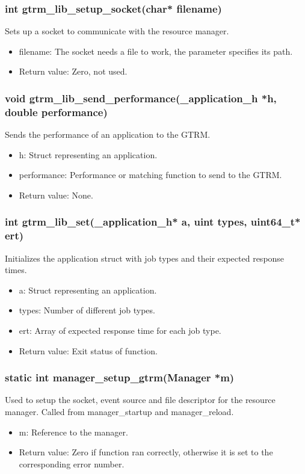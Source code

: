 \documentclass[nobiblatex]{LTHthesis}
\begin{document}
\subsubsection{int gtrm\_lib\_setup\_socket(char* filename)}
Sets up a socket to communicate with the resource manager.
\begin{itemize}
\item filename: The socket needs a file to work, the parameter specifies its path.
\item Return value: Zero, not used.
\end{itemize}

\subsubsection{void gtrm\_lib\_send\_performance(\_application\_h *h, double performance)}
Sends the performance of an application to the GTRM.
\begin{itemize}
\item h: Struct representing an application.
\item performance: Performance or matching function to send to the GTRM.
\item Return value: None.
\end{itemize}

\subsubsection{int gtrm\_lib\_set(\_application\_h* a, uint types, uint64\_t* ert)}
Initializes the application struct with job types and their expected response times.
\begin{itemize}
\item a: Struct representing an application.
\item types: Number of different job types.
\item ert: Array of expected response time for each job type.
\item Return value: Exit status of function.
\end{itemize}

\subsubsection{static int manager\_setup\_gtrm(Manager *m)}
Used to setup the socket, event source and file descriptor for the resource manager. Called from manager\_startup and manager\_reload.
\begin{itemize}
\item m: Reference to the manager.
\item Return value: Zero if function ran correctly, otherwise it is set to the corresponding error number.
\end{itemize}
\end{document}
